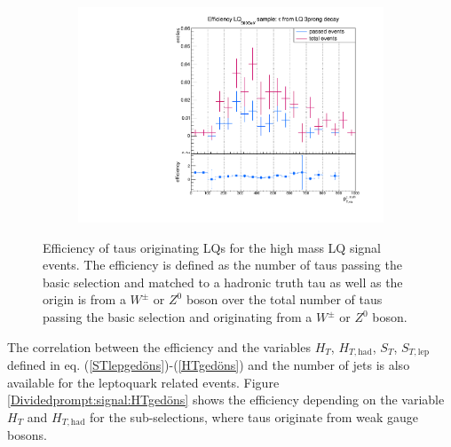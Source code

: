 \begin{figure}
\begin{subfigure}[t]{0.49\textwidth}
                \label{DividedfromLQ:signal:1prongLQ76}
                \end{subfigure}
                \begin{subfigure}[t]{0.49\textwidth}
                \includegraphics[width=\textwidth]{figures/plots/LQ76/Divided_fromLQ3prong.pdf}
                \label{DividedfromLQ:signal:3prongLQ76}
                \end{subfigure}            
\caption[Efficiency of taus originating LQs for the high mass LQ signal events.]{Efficiency of taus originating LQs for the high mass LQ signal events. The efficiency is defined as the number of taus passing the basic selection and matched to a hadronic truth tau as well as the origin is from a $W^\pm$ or $Z^0$ boson over the total number of taus passing the basic selection and originating from a $W^\pm$ or $Z^0$ boson.}
\label{DividedFromLQ:signal:LQ76}
\end{figure}
%
The correlation between the efficiency and the variables $H_T$, $H_{T,\text{had}}$, $S_T$, $S_{T,\text{lep}}$ defined in eq. (\ref{STlepgedöns})-(\ref{HTgedöns}) and the number of jets is also available for the leptoquark related events. \newline
Figure \ref{Dividedprompt:signal:HTgedöns} shows the efficiency depending on the variable $H_T$ and $H_{T,\text{had}}$ for the sub-selections, where taus originate from weak gauge bosons.
%
